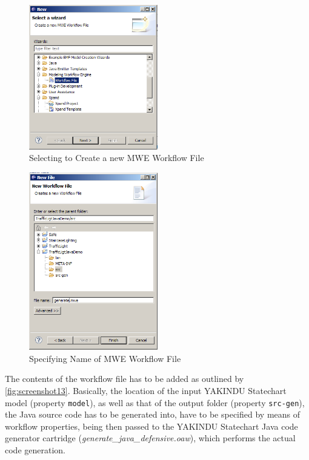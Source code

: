 \begin{figure}[h!]
\center
\includegraphics[width=0.5\textwidth]{./Pictures/Screenshot11}
\caption{\label{fig:screenshot11} Selecting to Create a new MWE Workflow File}
\end{figure}

\begin{figure}[h!]
\center
\includegraphics[width=0.5\textwidth]{./Pictures/Screenshot12}
\caption{\label{fig:screenshot12} Specifying Name of MWE Workflow File}
\end{figure}

\clearpage
The contents of the workflow file has to be added as outlined by
\ref{fig:screenshot13}. Basically, the location of the input YAKINDU
Statechart model (property \texttt{model}), as well as that of the output
folder (property \texttt{src-gen}), the Java source code has to be generated
into, have to be specified by means of workflow properties, being then passed
to the YAKINDU Statechart Java code generator cartridge
(\emph{generate\_java\_defensive.oaw}), which performs the actual code
generation.

